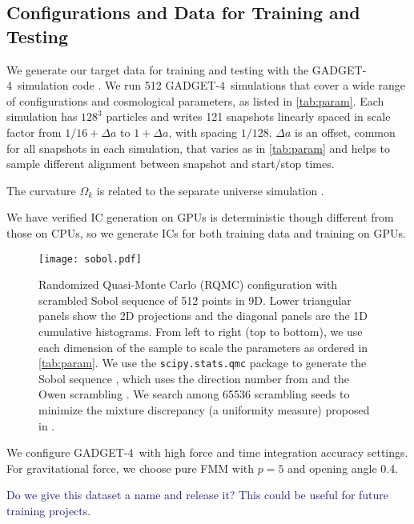 \documentclass[modern, trackchanges, dvipsnames]{aastex631}
\newcommand{\GADGET}{{{\fontsize{10pt}{12pt}\selectfont GADGET}-4}}
\newcommand{\YZ}[1]{\textcolor{MidnightBlue}{#1}}
\begin{document}
\vspace{1em}
\subsection{Configurations and Data for Training and Testing}

We generate our target data for training and testing with the \GADGET\
simulation code \citep{GADGET-4}.
We run 512 \GADGET\ simulations that cover a wide range of
configurations and cosmological parameters, as listed in
\autoref{tab:param}.
Each simulation has $128^3$ particles and writes 121 snapshots linearly
spaced in scale factor from $1/16 + \Delta a$ to $1 + \Delta a$, with
spacing $1/128$.
$\Delta a$ is an offset, common for all snapshots in each simulation,
that varies as in \autoref{tab:param} and helps to sample different
alignment between snapshot and start/stop times.

The curvature $\Omega_k$ is related to the separate universe simulation
\citep{LiEtAl2014, WagnerEtAl2015}.

We have verified IC generation on GPUs is deterministic though different
from those on CPUs, so we generate ICs for both training data and
training on GPUs.


\begin{figure*}
  \centering
  \texttt{[image: sobol.pdf]}
  \caption{Randomized Quasi-Monte Carlo (RQMC) configuration with
    scrambled Sobol sequence of 512 points in 9D.
    Lower triangular panels show the 2D projections and the diagonal
    panels are the 1D cumulative histograms.
    From left to right (top to bottom), we use each dimension of the
    sample to scale the parameters as ordered in \autoref{tab:param}.
    We use the \texttt{scipy.stats.qmc} package \citep{SciPy} to
    generate the Sobol sequence \citep{Sobol1967}, which uses the
    direction number from \citet{JoeKuo2008} and the Owen scrambling
    \citep{Owen1998}.
    We search among 65536 scrambling seeds to minimize the mixture
    discrepancy (a uniformity measure) proposed in \citet{Zhou2013MD}.
  }
  \label{fig:sobol}
\end{figure*}


We configure \GADGET\ with high force and time integration accuracy
settings.
For gravitational force, we choose pure FMM with $p=5$ and opening angle
0.4.

\YZ{Do we give this dataset a name and release it? This could be useful for
future training projects.}
\end{document}
